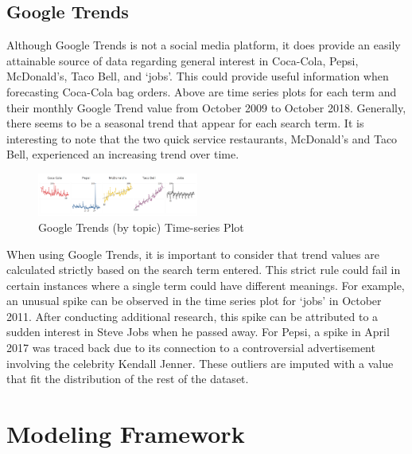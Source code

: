 \documentclass[12pt,oneside]{chicagocapstone}
\begin{document}
\hypertarget{methodology-modeling}{%
\subsection*{Google Trends}\label{methodology-modeling}}

Although Google Trends is not a social media platform, it does provide an easily attainable source of data regarding general interest in Coca-Cola, Pepsi, McDonald's, Taco Bell, and `jobs'. This could provide useful information when forecasting Coca-Cola bag orders.
Above are time series plots for each term and their monthly Google Trend value from October 2009 to October 2018. Generally, there seems to be a seasonal trend that appear for each search term. It is interesting to note that the two quick service restaurants, McDonald's and Taco Bell, experienced an increasing trend over time.
\begin{figure}

{\centering \includegraphics[width=200px,angle = 0, scale=2.1]{figure/GoogleTrends} 

}

\caption{Google Trends (by topic) Time-series Plot}\label{fig:GoogleTrends}
\end{figure}
When using Google Trends, it is important to consider that trend values are calculated strictly based on the search term entered. This strict rule could fail in certain instances where a single term could have different meanings. For example, an unusual spike can be observed in the time series plot for `jobs' in October 2011. After conducting additional research, this spike can be attributed to a sudden interest in Steve Jobs when he passed away. For Pepsi, a spike in April 2017 was traced back due to its connection to a controversial advertisement involving the celebrity Kendall Jenner. These outliers are imputed with a value that fit the distribution of the rest of the dataset.

\newpage

\hypertarget{methodology-modeling}{%
\section*{Modeling Framework}\label{methodology-modeling}}
\end{document}
